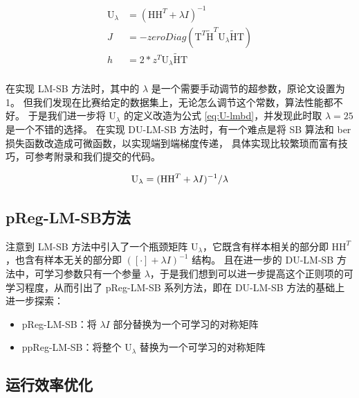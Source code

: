 \documentclass[withoutpreface,bwprint]{cumcmthesis}
\begin{document}
\begin{equation}
\begin{split}
\mathrm U_\lambda &= (\mathrm H \mathrm H^T + \lambda I)^{-1} \\
J &= -zeroDiag(\mathrm T^T \tilde{\mathrm H}^T \mathrm U_\lambda \tilde{\mathrm H} \mathrm T) \\
h &= 2 * z^T \mathrm U_\lambda \tilde{\mathrm H} \mathrm T \\
\end{split}
\label{eq:to-ising-du}
\end{equation}

在实现 LM-SB 方法时，其中的 $ \lambda $ 是一个需要手动调节的超参数，原论文设置为 1。
但我们发现在比赛给定的数据集上，无论怎么调节这个常数，算法性能都不好。
于是我们进一步将 $ \mathrm U_\lambda $ 的定义改造为公式 \ref{eq:U-lmbd}，并发现此时取 $ \lambda = 25 $ 是一个不错的选择。
在实现 DU-LM-SB 方法时，有一个难点是将 SB 算法和 ber 损失函数改造成可微函数，以实现端到端梯度传递，
具体实现比较繁琐而富有技巧，可参考附录和我们提交的代码。

\begin{equation}
\mathrm U_\lambda = (\mathrm H \mathrm H^T + \lambda I)^{-1} / \lambda \\
\label{eq:U-lmbd}
\end{equation}

\subsection{pReg-LM-SB方法}

注意到 LM-SB 方法中引入了一个瓶颈矩阵 $ \mathrm U_\lambda $，它既含有样本相关的部分即 $ \mathrm H \mathrm H^T $，也含有样本无关的部分即 $ ([\cdot] + \lambda I)^{-1} $ 结构。
且在进一步的 DU-LM-SB 方法中，可学习参数只有一个参量 $ \lambda $，于是我们想到可以进一步提高这个正则项的可学习程度，从而引出了 pReg-LM-SB 系列方法，即在 DU-LM-SB 方法的基础上进一步探索：

\begin{itemize}
\item pReg-LM-SB：将 $  \lambda I $ 部分替换为一个可学习的对称矩阵
\item ppReg-LM-SB：将整个 $ \mathrm U_\lambda $ 替换为一个可学习的对称矩阵
\end{itemize}

\subsection{运行效率优化}
\end{document}
